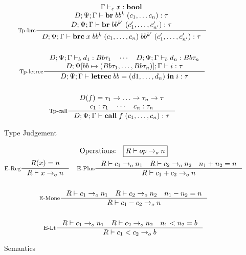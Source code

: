 \documentclass[a4paper, oneside, 10pt, draft]{memoir}
\begin{document}
\begin{figure}
\begin{gather*}
    \inference[Tp-brc]{\Gamma \tpc x : \tbool \\ D;\Psi;\Gamma |-
      \ibr{bb^k}{(c_1, \dotsc c_n)} : \tau \\
    D;\Psi;\Gamma |- \ibr{bb^{k'}}{(c'_1, \dotsc, c'_{n'})} : \tau}{D;\Psi;\Gamma |- \ibrc{x}{bb^k}{(c_1, \dotsc,
        c_n)}{bb^{k'}}{(c'_1, \dotsc, c'_{n'})} : \tau} \\\\
    \inference[Tp-letrec]{D;\Psi;\Gamma \tpb d_1 : Bb \tau_1 \quad
      \dotsb \quad D;\Psi;\Gamma \tpb d_n : Bb
      \tau_n \\
      D;\Psi[bb \mapsto (Bb \tau_1, \dotsc, Bb
      \tau_n)];\Gamma |- i : \tau}{D;\Psi;\Gamma |- \iletrec{bb}{(d1,
        \dotsc, d_n)}{i} : \tau}\\\\
    \inference[Tp-call]{D(f) = \tau_1 -> \dotsc -> \tau_n -> \tau\\
    c_1 : \tau_1 \quad \dotsb \quad c_n : \tau_n}{D;\Psi;\Gamma |- \icall{f}{(c_1, \dotsc,
        c_n)} : \tau}
  \end{gather*}
  \caption{Type Judgement}
  \label{fig:type-judgement}
\end{figure}

\newcommand{\eop}{->_{o}}
\begin{figure}
  \begin{gather*}
    \text{Operations:} \quad \boxed{R |- op \eop n}\\
    \inference[E-Reg]{R(x) = n}{R |- x \eop n} \quad
    \inference[E-Plus]{R |- c_1 \eop n_1 \quad R |- c_2 \eop n_2 \quad
      n_1 + n_2 = n}{R |- c_1 + c_2 \eop n}\\\\
    \inference[E-Mone]{R |- c_1 \eop n_1 \quad R |- c_2 \eop n_2 \quad
      n_1 - n_2 = n}{R |- c_1 - c_2 \eop n}\\\\
    \inference[E-Lt]{R |- c_1 \eop n_1 \quad R |- c_2 \eop n_2 \quad
      n_1 < n_2 = b}{R |- c_1  < c_2 \eop b}
  \end{gather*}

  \caption{Semantics}
  \label{fig:semantics}
\end{figure}


\end{document}

